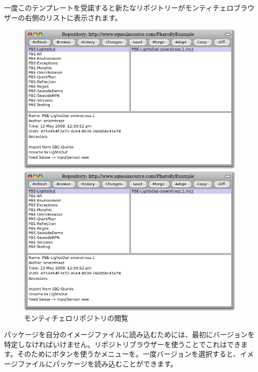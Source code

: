 \documentclass[a4paper,10pt,twoside]{book}
\begin{document}
一度このテンプレートを受諾すると新たなリポジトリーがモンティチェロブラウザーの右側のリストに表示されます。

\begin{figure}[hbt]
\ifluluelse
	{\centerline {\includegraphics[width=\textwidth]{BrowseRepository}}}
	{\centerline {\includegraphics[scale=0.7]{BrowseRepository}}}
\caption{モンティチェロリポジトリの閲覧
}
\end{figure}


パッケージを自分のイメージファイルに読み込むためには、最初にバージョンを特定しなければいけません。リポジトリブラウザーを使うことでこれはできます。そのためにボタンを使うかメニューを。一度バージョンを選択すると、イメージファイルにパッケージを読み込むことができます。
\end{document}
